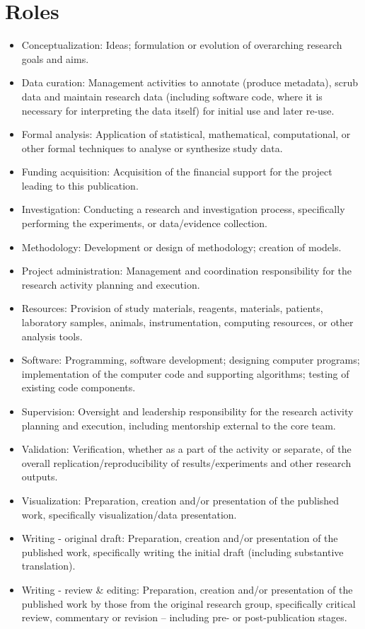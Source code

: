 \documentclass[
  oneside]{book}
\providecommand{\tightlist}{%
  \setlength{\itemsep}{0pt}\setlength{\parskip}{0pt}}
\begin{document}
\hypertarget{roles-1}{%
\section{Roles}\label{roles-1}}

\begin{itemize}
\tightlist
\item
  Conceptualization: Ideas; formulation or evolution of overarching research goals and aims.
\item
  Data curation: Management activities to annotate (produce metadata), scrub data and maintain research data (including software code, where it is necessary for interpreting the data itself) for initial use and later re-use.
\item
  Formal analysis: Application of statistical, mathematical, computational, or other formal techniques to analyse or synthesize study data.
\item
  Funding acquisition: Acquisition of the financial support for the project leading to this publication.
\item
  Investigation: Conducting a research and investigation process, specifically performing the experiments, or data/evidence collection.
\item
  Methodology: Development or design of methodology; creation of models.
\item
  Project administration: Management and coordination responsibility for the research activity planning and execution.
\item
  Resources: Provision of study materials, reagents, materials, patients, laboratory samples, animals, instrumentation, computing resources, or other analysis tools.
\item
  Software: Programming, software development; designing computer programs; implementation of the computer code and supporting algorithms; testing of existing code components.
\item
  Supervision: Oversight and leadership responsibility for the research activity planning and execution, including mentorship external to the core team.
\item
  Validation: Verification, whether as a part of the activity or separate, of the overall replication/reproducibility of results/experiments and other research outputs.
\item
  Visualization: Preparation, creation and/or presentation of the published work, specifically visualization/data presentation.
\item
  Writing - original draft: Preparation, creation and/or presentation of the published work, specifically writing the initial draft (including substantive translation).
\item
  Writing - review \& editing: Preparation, creation and/or presentation of the published work by those from the original research group, specifically critical review, commentary or revision -- including pre- or post-publication stages.
\end{itemize}
\end{document}
